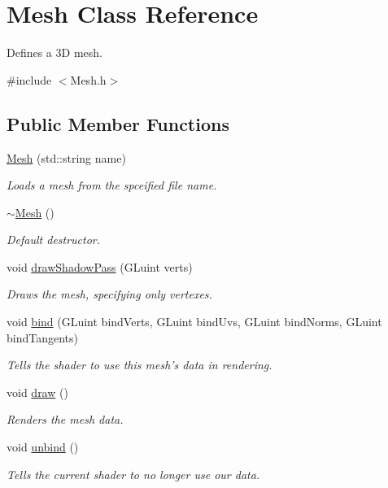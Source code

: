\hypertarget{class_mesh}{\section{Mesh Class Reference}
\label{class_mesh}
}


Defines a 3\-D mesh.  




{\ttfamily \#include $<$Mesh.\-h$>$}

\subsection*{Public Member Functions}
\begin{DoxyCompactItemize}
\item 
\hyperlink{class_mesh_a9b496cb615ff94d1e7d247eb89810791}{Mesh} (std\-::string name)
\begin{DoxyCompactList}\small\item\em Loads a mesh from the spceified file name. \end{DoxyCompactList}\item 
\hypertarget{class_mesh_a5efe4da1a4c0971cfb037bd70304c303}{\hyperlink{class_mesh_a5efe4da1a4c0971cfb037bd70304c303}{$\sim$\-Mesh} ()}\label{class_mesh_a5efe4da1a4c0971cfb037bd70304c303}

\begin{DoxyCompactList}\small\item\em Default destructor. \end{DoxyCompactList}\item 
void \hyperlink{class_mesh_ac8f218c96e9f31e9c8b9b69d284244a4}{draw\-Shadow\-Pass} (G\-Luint verts)
\begin{DoxyCompactList}\small\item\em Draws the mesh, specifying only vertexes. \end{DoxyCompactList}\item 
void \hyperlink{class_mesh_a740e2f5b099d18e3a8ed35fcbcf8efaf}{bind} (G\-Luint bind\-Verts, G\-Luint bind\-Uvs, G\-Luint bind\-Norms, G\-Luint bind\-Tangents)
\begin{DoxyCompactList}\small\item\em Tells the shader to use this mesh's data in rendering. \end{DoxyCompactList}\item 
void \hyperlink{class_mesh_a996a8668fa2ca7d95d6d10744c833bc8}{draw} ()
\begin{DoxyCompactList}\small\item\em Renders the mesh data. \end{DoxyCompactList}\item 
void \hyperlink{class_mesh_a2b8d5a5df0d13a63c984339539a3f376}{unbind} ()
\begin{DoxyCompactList}\small\item\em Tells the current shader to no longer use our data. \end{DoxyCompactList}\end{DoxyCompactItemize}


